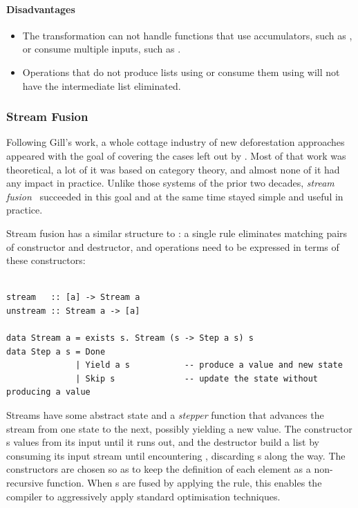 \paragraph{Disadvantages}
\begin{itemize}
    \item The transformation can not handle functions that use accumulators,
        such as , or consume multiple inputs, such as
        .

    \item Operations that do not produce lists using  or consume
        them using  will not have the intermediate list
        eliminated.
\end{itemize}


\subsubsection{Stream Fusion}

Following Gill's work, a whole cottage industry of new deforestation approaches
appeared with the goal of covering the cases left out by
. Most of that work was
theoretical, a lot of it was based on category theory, and almost none of it had
any impact in practice. Unlike those systems of the prior two decades,
\emph{stream fusion}~\cite{Coutts:2007kp} succeeded in this
goal and at the same time stayed simple and useful in practice.

Stream fusion has a similar structure to : a single rule
eliminates matching pairs of constructor and destructor, and operations need to
be expressed in terms of these constructors:
%
\begin{lstlisting}[style=Haskell,numbers=none,mathescape,caption={The \emph{stream fusion} transformation}]
%\bf$\langle$ stream fusion $\rangle$% forall s. stream (unstream s) $\mapsto$ s

stream   :: [a] -> Stream a
unstream :: Stream a -> [a]

data Stream a = exists s. Stream (s -> Step a s) s
data Step a s = Done
              | Yield a s           -- produce a value and new state
              | Skip s              -- update the state without producing a value
\end{lstlisting}

Streams have some abstract state and a \emph{stepper} function that advances the
stream from one state to the next, possibly yielding a new value. The
 constructor s values from its input until it runs
out, and the  destructor build a list by consuming its input
stream until encountering , discarding s along the
way. The  constructors are chosen so as to keep the definition of
each element as a non-recursive function. When s are fused by
applying the rule, this enables the compiler to aggressively apply standard
optimisation techniques.

